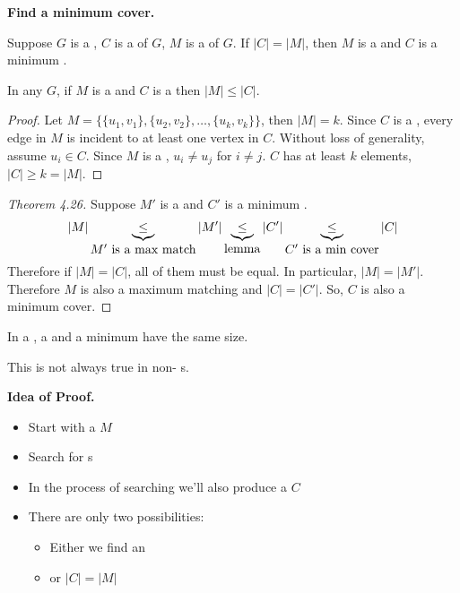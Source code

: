\documentclass[english, 11pt]{article}
\begin{document}
  \textbf{Find a minimum cover.}

  \begin{thrm}
    Suppose $G$ is a , $C$ is a  of $G$, $M$ is a  of $G$. If $|C| = |M|$, then $M$ is a   and $C$ is a minimum .
  \end{thrm}

  \begin{lem} In any  $G$, if $M$ is a  and $C$ is a  then $|M| \leq |C|$.
  \end{lem}

  \begin{proof}
    Let $M = \{\{u_1,v_1\}, \{u_2,v_2\}, \ldots, \{u_k, v_k\}\}$, then $|M| = k$. Since $C$ is a , every edge in $M$ is incident to at least one vertex in $C$. Without loss of generality, assume $u_i \in C$. Since $M$ is a , $u_i \not = u_j$ for $i \not = j$. $C$ has at least $k$ elements, $|C| \geq k = |M|$.
  \end{proof}

  \begin{proof}[Theorem 4.26]
    Suppose $M'$ is a   and $C'$ is a minimum . \[ |M| \underbrace{\leq}_{\mbox{$M'$ is a max match}}|M'| \underbrace{\leq}_{\mbox{lemma}} |C'| \underbrace{\leq}_{\mbox{$C'$ is a min cover}} |C| \]
    Therefore if $|M| = |C|$, all of them must be equal. In particular, $|M| = |M'|$. Therefore $M$ is also a maximum matching and $|C| = |C'|$. So, $C$ is also a minimum cover.
  \end{proof}

  \begin{thrm}\label{konig}
    In a  , a   and a minimum  have the same size.
  \end{thrm}

  \begin{note}
    This is not always true in non- s.
  \end{note}

  \textbf{Idea of Proof.}
  \begin{itemize}
    \item Start with a  $M$
    \item Search for s
    \item In the process of searching we'll also produce a  $C$
    \item There are only two possibilities:
    \begin{itemize}
      \item Either we find an 
      \item or $|C| = |M|$
    \end{itemize}
  \end{itemize}
\end{document}
